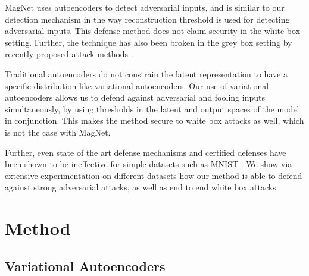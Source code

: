 \documentclass[letterpaper]{article} %
\begin{document}
MagNet  uses autoencoders to detect adversarial inputs, and is similar to our detection mechanism in the way reconstruction threshold is used for detecting adversarial inputs. This defense method does not claim security in the white box setting. Further, the technique has also been broken in the grey box setting by recently proposed attack methods . 

Traditional autoencoders do not constrain the latent representation to have a specific distribution like variational autoencoders. Our use of variational autoencoders allows us to defend against adversarial and fooling inputs simultaneously, by using thresholds in the latent and output spaces of the model in conjunction. This makes the method secure to white box attacks as well, which is not the case with MagNet.

Further, even state of the art defense mechanisms  and certified defenses have been shown to be ineffective for simple datasets such as MNIST . We show via extensive experimentation on different datasets how our method is able to defend against strong adversarial attacks, as well as end to end white box attacks.

\section{Method}

\subsection{Variational Autoencoders}
\end{document}
